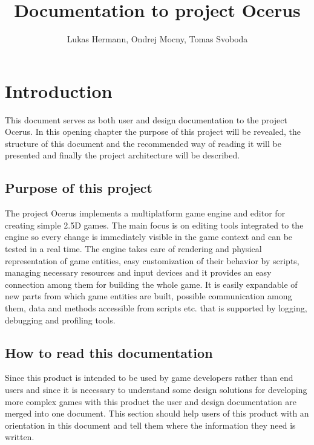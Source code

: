 \documentclass[a4paper, 12pt]{report}
\begin{document}
\pagestyle{empty} %

\title{Documentation to project Ocerus}
\author{Lukas Hermann, Ondrej Mocny, Tomas Svoboda}
\maketitle

\pagestyle{plain} %

\tableofcontents %
\cleardoublepage %

\chapter{Introduction}

This document serves as both user and design documentation to the project Ocerus. In this opening chapter the purpose of this project will be revealed, the structure of this document and the recommended way of reading it will be presented and finally the project architecture will be described.

\section{Purpose of this project}

The project Ocerus implements a multiplatform game engine and editor for creating simple 2.5D games. The main focus is on editing tools integrated to the engine so every change is immediately visible in the game context and can be tested in a real time. The engine takes care of rendering and physical representation of game entities, easy customization of their behavior by scripts, managing necessary resources and input devices and it provides an easy connection among them for building the whole game. It is easily expandable of new parts from which game entities are built, possible communication among them, data and methods accessible from scripts etc. that is supported by logging, debugging and profiling tools.

\section{How to read this documentation}

Since this product is intended to be used by game developers rather than end users and since it is necessary to understand some design solutions for developing more complex games with this product the user and design documentation are merged into one document. This section should help users of this product with an orientation in this document and tell them where the information they need is written.
\end{document}
